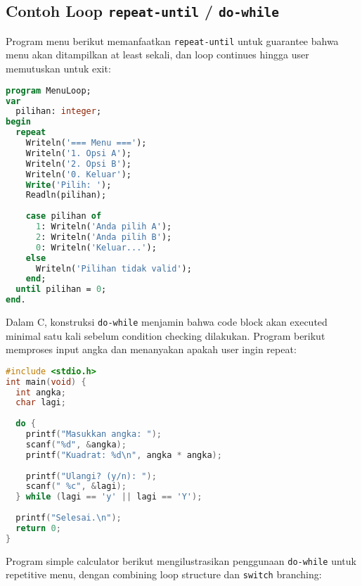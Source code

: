 \documentclass[../main.tex]{subfiles}
\begin{document}
\subsection{Contoh Loop \texttt{repeat-until} / \texttt{do-while}}

Program menu berikut memanfaatkan \texttt{repeat-until} untuk guarantee bahwa menu akan ditampilkan at least sekali, dan loop continues hingga user memutuskan untuk exit:

\begin{lstlisting}[language=Pascal, caption={Menu dengan repeat-until (Pascal)}]
program MenuLoop;
var
  pilihan: integer;
begin
  repeat
    Writeln('=== Menu ===');
    Writeln('1. Opsi A');
    Writeln('2. Opsi B');
    Writeln('0. Keluar');
    Write('Pilih: ');
    Readln(pilihan);
    
    case pilihan of
      1: Writeln('Anda pilih A');
      2: Writeln('Anda pilih B');
      0: Writeln('Keluar...');
    else
      Writeln('Pilihan tidak valid');
    end;
  until pilihan = 0;
end.
\end{lstlisting}

Dalam C, konstruksi \texttt{do-while} menjamin bahwa code block akan executed minimal satu kali sebelum condition checking dilakukan. Program berikut memproses input angka dan menanyakan apakah user ingin repeat:

\begin{lstlisting}[language=C, caption={Input ulang dengan do-while (C)}]
#include <stdio.h>
int main(void) {
  int angka;
  char lagi;
  
  do {
    printf("Masukkan angka: ");
    scanf("%d", &angka);
    printf("Kuadrat: %d\n", angka * angka);
    
    printf("Ulangi? (y/n): ");
    scanf(" %c", &lagi);
  } while (lagi == 'y' || lagi == 'Y');
  
  printf("Selesai.\n");
  return 0;
}
\end{lstlisting}

Program simple calculator berikut mengilustrasikan penggunaan \texttt{do-while} untuk repetitive menu, dengan combining loop structure dan \texttt{switch} branching:
\end{document}
